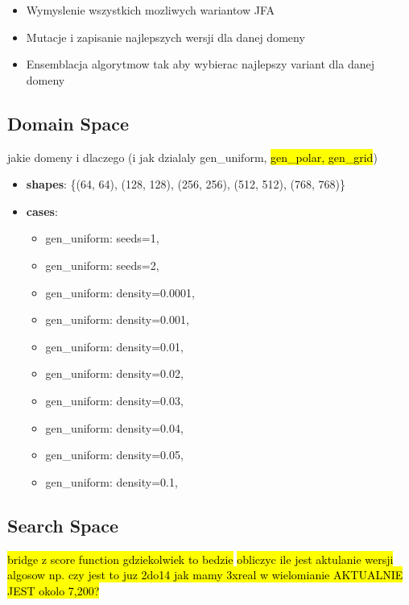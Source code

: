 \documentclass{article}
\begin{document}
\begin{itemize}
\item Wymyslenie wszystkich mozliwych wariantow JFA
\item Mutacje i zapisanie najlepszych wersji dla danej domeny
\item Ensemblacja algorytmow tak aby wybierac najlepszy variant dla danej domeny
\end{itemize}

\subsection{Domain Space} %

jakie domeny i dlaczego (i jak dzialaly gen\_uniform, \hl{gen\_polar, gen\_grid})

\begin{itemize}
	\item \textbf{shapes}: \{(64, 64), (128, 128), (256, 256), (512, 512), (768,
		768)\}
	\item \textbf{cases}:
        \begin{itemize}
			\item gen\_uniform: seeds=1,
			\item gen\_uniform: seeds=2,
			\item gen\_uniform: density=0.0001,
			\item gen\_uniform: density=0.001,
			\item gen\_uniform: density=0.01,
			\item gen\_uniform: density=0.02,
			\item gen\_uniform: density=0.03,
			\item gen\_uniform: density=0.04,
			\item gen\_uniform: density=0.05,
			\item gen\_uniform: density=0.1,
		\end{itemize}
\end{itemize}

\subsection{Search Space} %

\hl{bridge z score function gdziekolwiek to bedzie}
\hl{obliczyc ile jest aktulanie wersji algosow np. czy jest to juz 2do14 jak
mamy 3xreal w wielomianie AKTUALNIE JEST okolo 7,200?}
\end{document}
